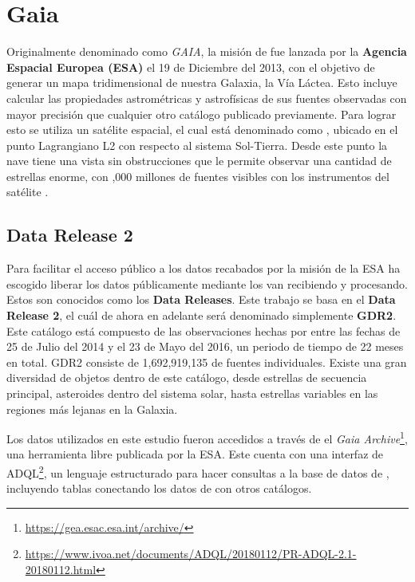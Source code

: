 \section{Gaia} \label{muestra:sec:gaia}

Originalmente denominado como \textit{GAIA}, la misión de \gaia fue lanzada por
la \textbf{Agencia Espacial Europea (ESA)} el 19 de Diciembre del 2013, con el
objetivo de generar un mapa tridimensional de nuestra Galaxia, la Vía Láctea.
Esto incluye calcular las propiedades astrométricas y astrofísicas de sus
fuentes observadas con mayor precisión que cualquier otro catálogo publicado
previamente. Para lograr esto se utiliza un satélite espacial, el cual está
denominado como \gaiaNoSpace, ubicado en el punto Lagrangiano L2 con respecto al
sistema Sol-Tierra. Desde este punto la nave tiene una vista sin obstrucciones
que le permite observar una cantidad de estrellas enorme, con ,000 millones de fuentes visibles con los instrumentos del satélite
\gaiaNoSpace. \citet*{gaiaMission}


\subsection{Data Release 2} \label{muestra:sec:gaia:dr2}

Para facilitar el acceso público a los datos recabados por la misión de \gaia la
ESA ha escogido liberar los datos públicamente mediante los van recibiendo y
procesando. Estos son conocidos como los \textbf{Data Releases}. Este trabajo se
basa en el \textbf{Data Release 2}, el cuál de ahora en adelante será denominado
simplemente \textbf{GDR2}. Este catálogo está compuesto de las observaciones
hechas por \gaia entre las fechas de 25 de Julio del 2014 y el 23 de Mayo del
2016, un periodo de tiempo de 22 meses en total. \citet*{gaiaDr2} GDR2 consiste
de 1,692,919,135 de fuentes individuales. Existe una gran diversidad de objetos
dentro de este catálogo, desde estrellas de secuencia principal, asteroides
dentro del sistema solar, hasta estrellas variables en las regiones más lejanas
en la Galaxia.

Los datos utilizados en este estudio fueron accedidos a través de el
\textit{Gaia Archive}\footnote{\url{https://gea.esac.esa.int/archive/}}, una
herramienta libre publicada por la ESA. Este cuenta con una interfaz de
ADQL\footnote{\url{https://www.ivoa.net/documents/ADQL/20180112/PR-ADQL-2.1-20180112.html}},
un lenguaje estructurado para hacer consultas a la base de datos de
\gaiaNoSpace, incluyendo tablas conectando los datos de \gaia con otros
catálogos.